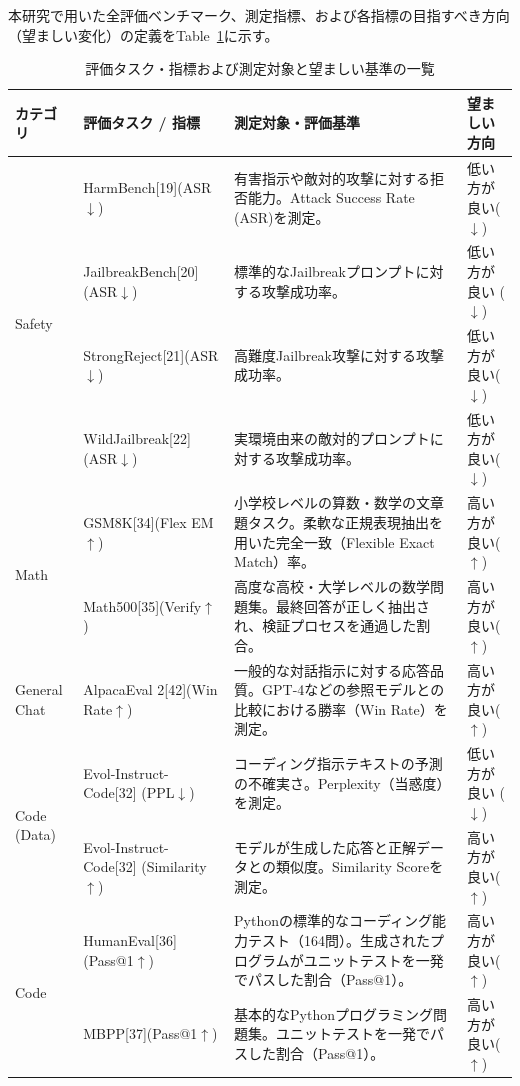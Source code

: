\documentclass{article}
\begin{document}
本研究で用いた全評価ベンチマーク、測定指標、および各指標の目指すべき方向（望ましい変化）の定義をTable~\ref{tab:evaluation_metrics}に示す。
\begin{table}[htbp]
\centering
\caption{評価タスク・指標および測定対象と望ましい基準の一覧}
\label{tab:evaluation_metrics}
\small
\begin{tabularx}{\textwidth}{p{2.0cm}p{3.3cm}Xp{2.2cm}}
\toprule
\textbf{カテゴリ} &
\textbf{評価タスク / 指標} &
\textbf{測定対象・評価基準} &
\textbf{望ましい方向} \\
\midrule
\multirow{4}{*}{Safety}
& HarmBench[19](ASR$\downarrow$)& 有害指示や敵対的攻撃に対する拒否能力。Attack Success Rate (ASR)を測定。 & 低い方が良い($\downarrow$) \\
& JailbreakBench[20](ASR$\downarrow$) & 標準的なJailbreakプロンプトに対する攻撃成功率。& 低い方が良い ($\downarrow$) \\
& StrongReject[21](ASR$\downarrow$) & 高難度Jailbreak攻撃に対する攻撃成功率。 & 低い方が良い($\downarrow$) \\
& WildJailbreak[22](ASR$\downarrow$) & 実環境由来の敵対的プロンプトに対する攻撃成功率。 & 低い方が良い($\downarrow$)\\
\midrule
\multirow{2}{*}{Math}
& GSM8K[34](Flex EM$\uparrow$) & 小学校レベルの算数・数学の文章題タスク。柔軟な正規表現抽出を用いた完全一致（Flexible Exact Match）率。 & 高い方が良い($\uparrow$) \\
& Math500[35](Verify$\uparrow$) & 高度な高校・大学レベルの数学問題集。最終回答が正しく抽出され、検証プロセスを通過した割合。 & 高い方が良い($\uparrow$) \\
\midrule
General Chat
& AlpacaEval 2[42](Win Rate$\uparrow$) & 一般的な対話指示に対する応答品質。GPT-4などの参照モデルとの比較における勝率（Win Rate）を測定。 & 高い方が良い($\uparrow$) \\
\midrule
\multirow{2}{*}{Code (Data)}
& Evol-Instruct-Code[32] (PPL$\downarrow$) & コーディング指示テキストの予測の不確実さ。Perplexity（当惑度）を測定。 & 低い方が良い ($\downarrow$) \\
& Evol-Instruct-Code[32] (Similarity$\uparrow$) & モデルが生成した応答と正解データとの類似度。Similarity Scoreを測定。 & 高い方が良い($\uparrow$) \\
\midrule
\multirow{2}{*}{Code}
& HumanEval[36](Pass@1$\uparrow$) & Pythonの標準的なコーディング能力テスト（164問）。生成されたプログラムがユニットテストを一発でパスした割合（Pass@1）。 & 高い方が良い($\uparrow$) \\
& MBPP[37](Pass@1$\uparrow$) & 基本的なPythonプログラミング問題集。ユニットテストを一発でパスした割合（Pass@1）。 & 高い方が良い($\uparrow$) \\

\end{tabularx}
\end{table}
\end{document}
